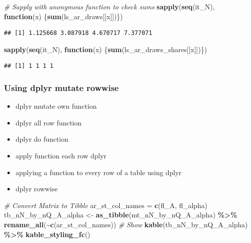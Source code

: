 \documentclass[
]{book}
\newenvironment{Shaded}{\begin{snugshade}}{\end{snugshade}}
\newcommand{\CommentTok}[1]{\textcolor[rgb]{0.56,0.35,0.01}{\textit{#1}}}
\newcommand{\ControlFlowTok}[1]{\textcolor[rgb]{0.13,0.29,0.53}{\textbf{#1}}}
\newcommand{\KeywordTok}[1]{\textcolor[rgb]{0.13,0.29,0.53}{\textbf{#1}}}
\newcommand{\NormalTok}[1]{#1}
\newcommand{\OperatorTok}[1]{\textcolor[rgb]{0.81,0.36,0.00}{\textbf{#1}}}
\newcommand{\StringTok}[1]{\textcolor[rgb]{0.31,0.60,0.02}{#1}}
\providecommand{\tightlist}{%
  \setlength{\itemsep}{0pt}\setlength{\parskip}{0pt}}
\begin{document}
\begin{Shaded}
\begin{Highlighting}[]
\CommentTok{\# Sapply with anonymous function to check sums}
\KeywordTok{sapply}\NormalTok{(}\KeywordTok{seq}\NormalTok{(it\_N), }\ControlFlowTok{function}\NormalTok{(x) \{}\KeywordTok{sum}\NormalTok{(ls\_ar\_draws[[x]])\})}
\end{Highlighting}
\end{Shaded}

\begin{verbatim}
## [1] 1.125668 3.087918 4.670717 7.377071
\end{verbatim}

\begin{Shaded}
\begin{Highlighting}[]
\KeywordTok{sapply}\NormalTok{(}\KeywordTok{seq}\NormalTok{(it\_N), }\ControlFlowTok{function}\NormalTok{(x) \{}\KeywordTok{sum}\NormalTok{(ls\_ar\_draws\_shares[[x]])\})}
\end{Highlighting}
\end{Shaded}

\begin{verbatim}
## [1] 1 1 1 1
\end{verbatim}

\hypertarget{using-dplyr-mutate-rowwise}{%
\subsubsection{Using dplyr mutate rowwise}\label{using-dplyr-mutate-rowwise}}

\begin{itemize}
\tightlist
\item
  dplyr mutate own function
\item
  dplyr all row function
\item
  dplyr do function
\item
  apply function each row dplyr
\item
  applying a function to every row of a table using dplyr
\item
  dplyr rowwise
\end{itemize}

\begin{Shaded}
\begin{Highlighting}[]
\CommentTok{\# Convert Matrix to Tibble}
\NormalTok{ar\_st\_col\_names =}\StringTok{ }\KeywordTok{c}\NormalTok{(}\StringTok{\textquotesingle{}fl\_A\textquotesingle{}}\NormalTok{, }\StringTok{\textquotesingle{}fl\_alpha\textquotesingle{}}\NormalTok{)}
\NormalTok{tb\_nN\_by\_nQ\_A\_alpha \textless{}{-}}\StringTok{ }\KeywordTok{as\_tibble}\NormalTok{(mt\_nN\_by\_nQ\_A\_alpha) }\OperatorTok{\%\textgreater{}\%}
\StringTok{  }\KeywordTok{rename\_all}\NormalTok{(}\OperatorTok{\textasciitilde{}}\KeywordTok{c}\NormalTok{(ar\_st\_col\_names))}
\CommentTok{\# Show}
\KeywordTok{kable}\NormalTok{(tb\_nN\_by\_nQ\_A\_alpha) }\OperatorTok{\%\textgreater{}\%}
\StringTok{  }\KeywordTok{kable\_styling\_fc}\NormalTok{()}
\end{Highlighting}
\end{Shaded}
\end{document}
